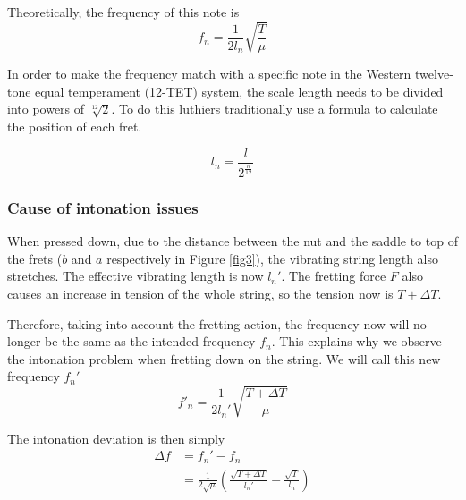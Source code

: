 \documentclass[11pt]{article}
\begin{document}
\begin{flushleft}
                Theoretically, the frequency of this note is 
                \begin{equation}\label{eqn5}
                    f_n = \frac{1}{2l_n}\sqrt{\frac{T}{\mu}}
                \end{equation}

                In order to make the frequency match with a specific note in the Western twelve-tone equal temperament (12-TET) system, the scale length needs to be divided into powers of $\sqrt[12]{2}$. To do this luthiers traditionally use a formula to calculate the position of each fret. \cite{eqn6}

                \begin{equation}\label{eqn6}
                    l_n=\frac{l}{2^\frac{n}{12}}
                \end{equation}
            
            \subsubsection*{Cause of intonation issues}
                When pressed down, due to the distance between the nut and the saddle to top of the frets ($b$ and $a$ respectively in Figure \ref{fig3}), the vibrating string length also stretches. The effective vibrating length is now $l_n'$. The fretting force $F$ also causes an increase in tension of the whole string, so the tension now is $T+ \Delta T$. \par
                Therefore, taking into account the fretting action, the frequency now will no longer be the same as the intended frequency $f_n$. This explains why we observe the intonation problem when fretting down on the string. We will call this new frequency $f_n'$
                \begin{equation}\label{eqn7}
                    f'_n= \frac{1}{2l_n'}\sqrt{\frac{T+\Delta T}{\mu}}
                \end{equation}
                
                The intonation deviation is then simply
                \begin{align}
                    \Delta f &= f_n'-f_n \\
                    &= \frac{1}{2\sqrt{\mu}} \left( \frac{\sqrt{T+\Delta T}}{l_n'} - \frac{\sqrt{T}}{l_n} \right)\label{eqn9}
                \end{align}
                

\end{flushleft}
\end{document}
